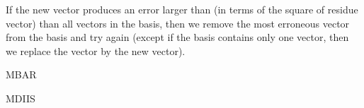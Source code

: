 \documentclass{revtex4-1}
\begin{document}
If the new vector produces an error
larger than (in terms of the square of residue vector)
than all vectors in the basis,
then we remove the most erroneous vector
from the basis and try again
(except if the basis contains only one vector,
then we replace the vector by the new vector).

MBAR\cite{shirts2008}

MDIIS\cite{kovalenko1999}



\end{document}
